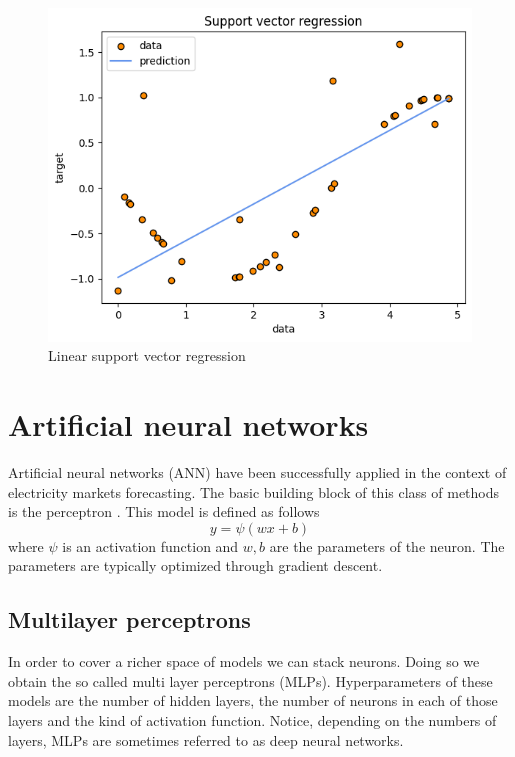 \begin{figure}
    \includegraphics[width=\textwidth]{images/svr1.png}
    \caption{Linear support vector regression}
    \label{fig:svr1}
\end{figure}

\section{Artificial neural networks}
Artificial neural networks (ANN) have been successfully applied in the context of electricity markets forecasting. The basic building block of this class of methods is the perceptron \cite{rosenblatt1958perceptron}.
This model is defined as follows
\begin{equation}
    y=\psi(wx+b)
\end{equation}
where $\psi$ is an activation function and $w,b$ are the parameters of the neuron. The parameters are typically optimized through gradient descent.

\subsection{Multilayer perceptrons}
In order to cover a richer space of models we can stack neurons. Doing so we obtain the so called multi layer perceptrons (MLPs). Hyperparameters of these models are the number of hidden layers, the number of neurons in each of those layers and the kind of activation function.
Notice, depending on the numbers of layers, MLPs are sometimes referred to as deep neural networks.

